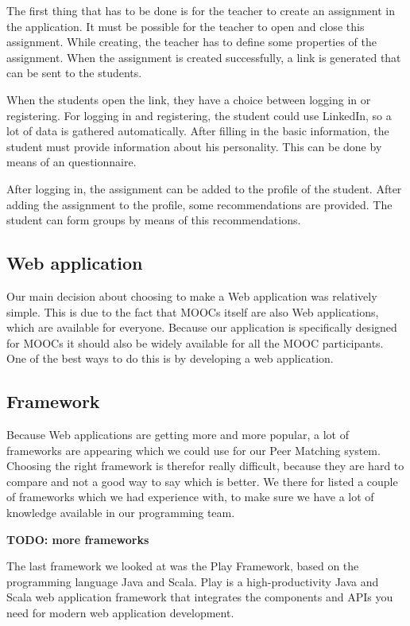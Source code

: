\documentclass[]{article}
\newcommand{\TODO}[1]{{\color{red}\textbf{TODO: #1}}}
\begin{document}
The first thing that has to be done is for the teacher to create an assignment in the application.
It must be possible for the teacher to open and close this assignment. 
While creating, the teacher has to define some properties of the assignment.
When the assignment is created successfully, a link is generated that can be sent to the students.

When the students open the link, they have a choice between logging in or registering.
For logging in and registering, the student could use LinkedIn, so a lot of data is gathered automatically.
After filling in the basic information, the student must provide information about his personality.
This can be done by means of an questionnaire.

After logging in, the assignment can be added to the profile of the student.
After adding the assignment to the profile, some recommendations are provided.
The student can form groups by means of this recommendations.

\subsection{Web application}
Our main decision about choosing to make a Web application was relatively simple.
This is due to the fact that MOOCs itself are also Web applications, which are available for everyone.
Because our application is specifically designed for MOOCs it should also be widely available for all the MOOC participants.
One of the best ways to do this is by developing a web application.

\subsection{Framework}
Because Web applications are getting more and more popular, a lot of frameworks are appearing which we could use for our Peer Matching system.
Choosing the right framework is therefor really difficult, because they are hard to compare and not a good way to say which is better.
We there for listed a couple of frameworks which we had experience with, to make sure we have a lot of knowledge available in our programming team.

\TODO{more frameworks}

The last framework we looked at was the Play Framework\cite{play}, based on the programming language Java and Scala.
Play is a high-productivity Java and Scala web application framework that integrates the components and APIs you need for modern web application development.
\end{document}
